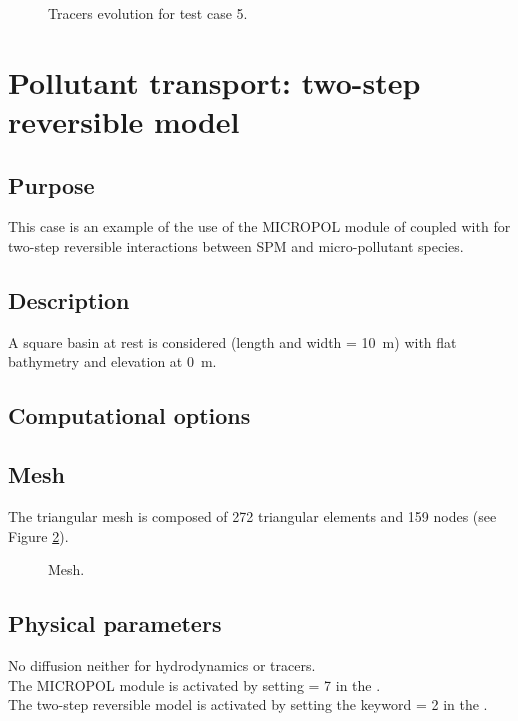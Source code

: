 \begin{figure} [H]
\centering
{}
 \caption{Tracers evolution for test case 5.}
 \label{fig:waq2d_micropol:pol_5}
\end{figure}

\section{Pollutant transport: two-step reversible model}

\subsection{Purpose}

This case is an example of the use of the MICROPOL module of \waqtel
coupled with  for two-step reversible interactions between SPM and
micro-pollutant species.

\subsection{Description}

A square basin at rest is considered (length and width = 10~m)
with flat bathymetry and elevation at 0~m.

\subsection{Computational options}

\subsection{Mesh}

The triangular mesh is composed of 272 triangular elements and 159 nodes
(see Figure \ref{fig:waq2d_micropol:kin2_mesh}).

\begin{figure}[H]
 \centering
\caption{Mesh.}
 \label{fig:waq2d_micropol:kin2_mesh}
\end{figure}

\subsection{Physical parameters}
No diffusion neither for hydrodynamics or tracers.\\
The MICROPOL module is activated by setting  = 7
in the  .\\
The two-step reversible model is activated by setting the keyword  = 2 in the \waqtel {}.\\

